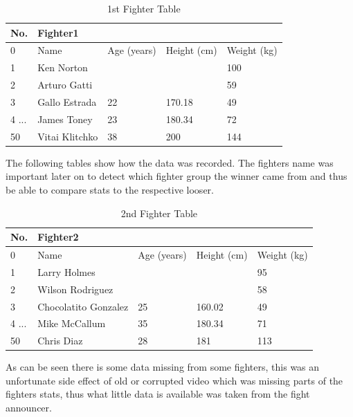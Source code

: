 \documentclass{article}
\begin{document}
\begin{table}[H]
\centering
\caption{1st Fighter Table}
\label{my-label}
\begin{tabular}{|l|l|l|l|l|}
\hline
No.   & \multicolumn{4}{l|}{Fighter1}          \\ \hline
0     & Name           & Age (years) & Height (cm) & Weight (kg) \\ \hline
1     & Ken Norton     &     &        & 100    \\ \hline
2     & Arturo Gatti   &     &        & 59     \\ \hline
3     & Gallo Estrada  & 22  & 170.18 & 49     \\ \hline
4 ... & James Toney    & 23  & 180.34 & 72     \\ \hline
50    & Vitai Klitchko & 38  & 200    & 144    \\ \hline
\end{tabular}
\end{table}
The following tables show how the data was recorded. The fighters name was important later on to detect which fighter group the winner came from and thus be able to compare stats to the respective looser.


\begin{table}[H]
\centering
\caption{2nd Fighter Table}
\label{my-label}
\begin{tabular}{|l|l|l|l|l|}
\hline
No.   & \multicolumn{4}{l|}{Fighter2}                                  \\ \hline
0     & Name                 & Age (years) & Height (cm) & Weight (kg) \\ \hline
1     & Larry Holmes         &             &             & 95          \\ \hline
2     & Wilson Rodriguez     &             &             & 58          \\ \hline
3     & Chocolatito Gonzalez & 25          & 160.02      & 49          \\ \hline
4 ... & Mike McCallum        & 35          & 180.34      & 71          \\ \hline
50    & Chris Diaz           & 28          & 181         & 113         \\ \hline
\end{tabular}
\end{table}
As can be seen there is some data missing from some fighters, this was an unfortunate side effect of old or corrupted video which was missing parts of the fighters stats, thus what little data is available was taken from the fight announcer.
\end{document}
